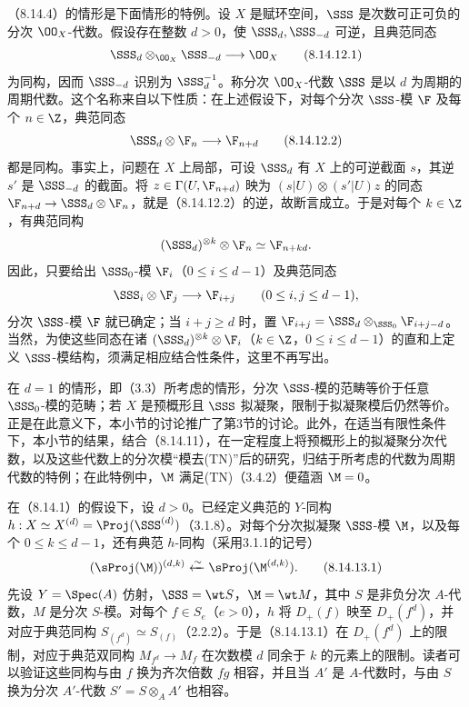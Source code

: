  （8.14.4）的情形是下面情形的特例。设 $X$ 是赋环空间，$\SSS$ 是次数可正可负的分次 $\OO_X$-代数。假设存在整数 $d>0$，使 $\SSS_d,\SSS_{-d}$ 可逆，且典范同态
\begin{equation}\SSS_d\otimes_{\OO_X}\SSS_{-d}\longrightarrow\OO_X\tag{8.14.12.1}\end{equation}
为同构，因而 $\SSS_{-d}$ 识别为 $\SSS_d^{-1}$。称分次 $\OO_X$-代数 $\SSS$ 是以 $d$ 为周期的周期代数。这个名称来自以下性质：在上述假设下，对每个分次 $\SSS$-模 $\F$ 及每个 $n\in\Z$，典范同态
\begin{equation}\SSS_d\otimes\F_n\longrightarrow\F_{n+d}\tag{8.14.12.2}\end{equation}
都是同构。事实上，问题在 $X$ 上局部，可设 $\SSS_d$ 有 $X$ 上的可逆截面 $s$，其逆 $s'$ 是 $\SSS_{-d}$ 的截面。将 $z\in\Gamma(U,\F_{n+d})$ 映为 $(s|U)\otimes(s'|U)z$ 的同态 $\F_{n+d}\to\SSS_d\otimes\F_n$，就是（8.14.12.2）的逆，故断言成立。于是对每个 $k\in\Z$，有典范同构
\[(\SSS_d)^{\otimes k}\otimes\F_n\simeq\F_{n+kd}.\]
因此，只要给出 $\SSS_0$-模 $\F_i$（$0\leq i\leq d-1$）及典范同态
\[\SSS_i\otimes\F_j\longrightarrow\F_{i+j}\qquad(0\leq i,j\leq d-1),\]
分次 $\SSS$-模 $\F$ 就已确定；当 $i+j\geq d$ 时，置 $\F_{i+j}=\SSS_d\otimes_{\SSS_0}\F_{i+j-d}$。当然，为使这些同态在诸 $(\SSS_d)^{\otimes k}\otimes\F_i$（$k\in\Z$，$0\leq i\leq d-1$）的直和上定义 $\SSS$-模结构，须满足相应结合性条件，这里不再写出。

在 $d=1$ 的情形，即（3.3）所考虑的情形，分次 $\SSS$-模的范畴等价于任意 $\SSS_0$-模的范畴；若 $X$ 是预概形且 $\SSS$ 拟凝聚，限制于拟凝聚模后仍然等价。正是在此意义下，本小节的讨论推广了第3节的讨论。此外，在适当有限性条件下，本小节的结果，结合（8.14.11），在一定程度上将预概形上的拟凝聚分次代数，以及这些代数上的分次模“模去(TN)”后的研究，归结于所考虑的代数为周期代数的特例；在此特例中，$\M$ 满足(TN)（3.4.2）便蕴涵 $\M=0$。

 在（8.14.1）的假设下，设 $d>0$。已经定义典范的 $Y$-同构 $h:X\simeq X^{(d)}=\Proj(\SSS^{(d)})$（3.1.8）。对每个分次拟凝聚 $\SSS$-模 $\M$，以及每个 $0\leq k\leq d-1$，还有典范 $h$-同构（采用3.1.1的记号）
\begin{equation}(\sProj(\M))^{(d,k)}\xleftarrow{\sim}\sProj(\M^{(d,k)}).\tag{8.14.13.1}\end{equation}
先设 $Y=\Spec(A)$ 仿射，$\SSS=\wt S$，$\M=\wt M$，其中 $S$ 是非负分次 $A$-代数，$M$ 是分次 $S$-模。对每个 $f\in S_e$（$e>0$），$h$ 将 $D_+(f)$ 映至 $D_+(f^d)$，并对应于典范同构 $S_{(f^d)}\simeq S_{(f)}$（2.2.2）。于是（8.14.13.1）在 $D_+(f^d)$ 上的限制，对应于典范双同构 $M_{f^d}\to M_f$ 在次数模 $d$ 同余于 $k$ 的元素上的限制。读者可以验证这些同构与由 $f$ 换为齐次倍数 $fg$ 相容，并且当 $A'$ 是 $A$-代数时，与由 $S$ 换为分次 $A'$-代数 $S'=S\otimes_A A'$ 也相容。

